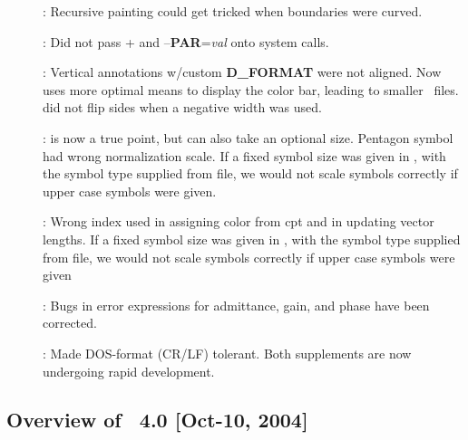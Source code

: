 \begin{description}
\item []: Recursive painting could get tricked when boundaries were curved.
\item []: Did not pass + and --{\bf PAR}={\it val} onto system calls.
\item []: Vertical annotations w/custom {\bf D\_FORMAT} were not aligned. Now uses more optimal means
to display the color bar, leading to smaller \PS\ files.   did not flip sides when a negative width was used.
\item []:  is now a true point, but can also take an optional size.  Pentagon symbol had wrong
normalization scale.  If a fixed symbol size was given in , with the symbol type supplied from file,
we would not scale symbols correctly if upper case symbols were given.
\item []: Wrong index used in assigning color from cpt and in updating vector lengths.  If a fixed symbol
size was given in , with the symbol type supplied from file,
we would not scale symbols correctly if upper case symbols were given
\item []: Bugs in error expressions for admittance, gain, and phase have been corrected.
\item []: Made DOS-format (CR/LF) tolerant.  Both supplements are now undergoing rapid
development.
\end{description}

\subsection{Overview of \gmt\ 4.0 [Oct-10, 2004]}

